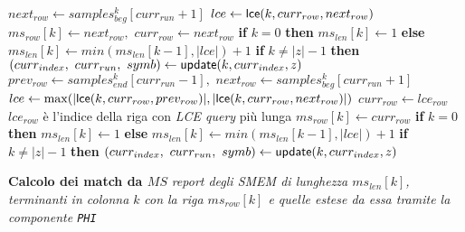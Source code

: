 \begin{algorithm}
\begin{algorithmic}[1]
    \State $next_{row}\gets samples_{beg}^k[curr_{run}+1]$ 
    \State $lce\gets \mbox{\rm {\sf lce}}(k, curr_{row}, next_{row})$
    \State $ms_{row}[k]\gets next_{row},\,\,curr_{row}\gets next_{row}$
    \State \textbf{if} $k=0$ \textbf{then} $ms_{len}[k] \gets 1$ \textbf{else}
    $ms_{len}[k] \gets min(ms_{len}[k-1], |lce|)+1$
    \State \textbf{if} $k\neq |z|-1$ \textbf{then} $(curr_{index},\,\,
    curr_{run},\,\,symb)\gets \mbox{\rm {\sf update}}(k, curr_{index},z)$  
    \Else
    \State $prev_{row}\gets samples_{end}^k[curr_{run}-1],\,\,next_{row}\gets
    samples_{beg}^k[curr_{run}+1]$ 
    \State $lce\gets \max (|\mbox{\rm {\sf lce}}(k, curr_{row}, prev_{row})|, |\mbox{\rm {\sf lce}}(k,
    curr_{row}, next_{row})|)$
    \State $curr_{row}\gets lce_{row}$
    \Comment $lce_{row}$ è l'indice della riga con \textit{LCE query} più
    lunga 
    \State $ms_{row}[k]\gets curr_{row}$
    \State \textbf{if} $k=0$ \textbf{then} $ms_{len}[k] \gets 1$ \textbf{else}
    $ms_{len}[k] \gets min(ms_{len}[k-1], |lce|)+1$
    \State \textbf{if} $k\neq |z|-1$ \textbf{then}
    $(curr_{index},\,\,curr_{run},\,\,symb)\gets \mbox{\rm {\sf update}}(k, curr_{index},z)$ 
    \EndIf
    \EndIf
    \EndIf
    \EndFor
    
    \For {\textit{every} $k\in[0,|z|)$}
    \Comment \textbf{Calcolo dei match da $MS$}
    \State \textit{report degli SMEM di lunghezza $ms_{len}[k]$, terminanti in
    colonna $k$}
    \State \textit{con la riga $ms_{row}[k]$ e quelle estese da essa tramite
    la componente \texttt{PHI}} 
    \EndIf
    \EndFor
    \EndFunction
    
  \end{algorithmic}
  \caption{\footnotesize{Calcolo degli SMEM con aplotipo esterno con componenti
  \texttt{MAP-INT/BV} (i cui usi diversificati sono segnalati con ``oppure''),
  \texttt{LCE}, \texttt{PERM} e \texttt{PHI}.}}
  \label{algo:matchlce}
\end{algorithm}
